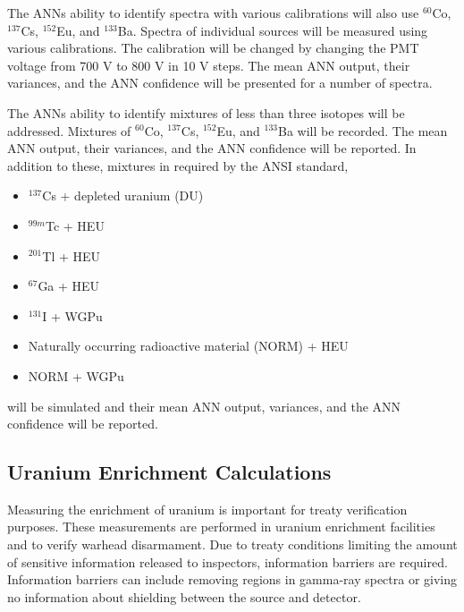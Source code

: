 \documentclass[tocnosub,noragright,centerchapter,12pt,fullpage]{uiucecethesis09}
\begin{document}
The ANNs ability to identify spectra with various calibrations will also use $^{60}$Co, $^{137}$Cs, $^{152}$Eu, and $^{133}$Ba. Spectra of individual sources will be measured using various calibrations. The calibration will be changed by changing the PMT voltage from 700 V to 800 V in 10 V steps. The mean ANN output, their variances, and the ANN confidence will be presented for a number of spectra. 

The ANNs ability to identify mixtures of less than three isotopes will be addressed. Mixtures of $^{60}$Co, $^{137}$Cs, $^{152}$Eu, and $^{133}$Ba will be recorded. The mean ANN output, their variances, and the ANN confidence will be reported. In addition to these, mixtures in required by the ANSI standard, 

\begin{itemize}
  \item $^{137}$Cs + depleted uranium (DU)
  \item $^{99m}$Tc + HEU
  \item $^{201}$Tl + HEU
  \item $^{67}$Ga + HEU
  \item $^{131}$I + WGPu
  \item Naturally occurring radioactive material (NORM) + HEU
  \item NORM + WGPu
\end{itemize}

will be simulated and their mean ANN output, variances, and the ANN confidence will be reported. 




\subsection{Uranium Enrichment Calculations}

Measuring the enrichment of uranium is important for treaty verification purposes. These measurements are performed in uranium enrichment facilities and to verify warhead disarmament. Due to treaty conditions limiting the amount of sensitive information released to inspectors, information barriers are required. Information barriers can include removing regions in gamma-ray spectra or giving no information about shielding between the source and detector. 
\end{document}
